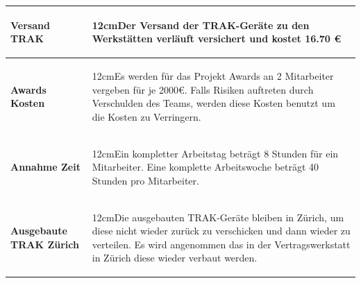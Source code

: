 \documentclass[a4paper,10pt]{scrartcl}
\newcommand\Absatz[2][12cm]{\begin{varwidth}{#1}\flushleft#2\end{varwidth}}
\begin{document}
\begin{adjustbox}{width=\textwidth}
\begin{tabular}{ll}
\textbf{Versand TRAK}  & {\Absatz{Der Versand der TRAK-Geräte zu den Werkstätten verläuft versichert und kostet 16.70 \euro
\linebreak}} \\
\midrule
\textbf{Awards Kosten}  & {\Absatz{Es werden für das Projekt Awards an 2 Mitarbeiter vergeben für je 2000\euro. Falls Risiken auftreten durch Verschulden des Teams, werden diese Kosten benutzt um die Kosten zu Verringern.
\linebreak}} \\
\midrule
\textbf{Annahme Zeit}  & {\Absatz{Ein kompletter Arbeitstag beträgt 8 Stunden für ein Mitarbeiter. Eine komplette Arbeitswoche beträgt 40 Stunden pro Mitarbeiter.
\linebreak}} \\
\midrule
\textbf{Ausgebaute TRAK Zürich}  & {\Absatz{Die ausgebauten TRAK-Geräte bleiben in Zürich, um diese nicht wieder zurück zu verschicken und dann wieder zu verteilen. Es wird angenommen das in der Vertragswerkstatt in Zürich diese wieder verbaut werden.
\linebreak}} \\
\bottomrule
\end{tabular}
\end{adjustbox}
\end{document}
